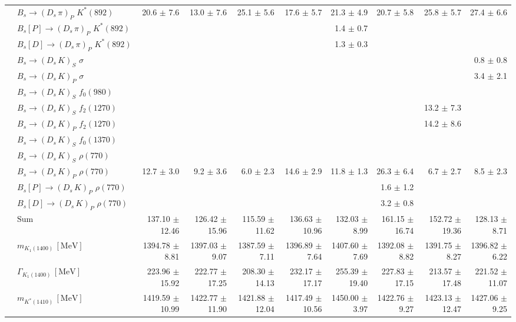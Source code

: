 \begin{tabular}{l l  r  r  r  r  r  r  r  r  }
 & $B_s \to ( D_s \, \pi)_{P} \, \, K^{*}(892)$ & 20.6 $\pm$ 7.6 & 13.0 $\pm$ 7.6 & 25.1 $\pm$ 5.6 & 17.6 $\pm$ 5.7 & 21.3 $\pm$ 4.9 & 20.7 $\pm$ 5.8 & 25.8 $\pm$ 5.7 & 27.4 $\pm$ 6.6 \\ 
 & $B_s[P] \to ( D_s \, \pi)_{P} \, \, K^{*}(892)$ &  &  &  &  & 1.4 $\pm$ 0.7 &  &  &  \\ 
 & $B_s[D] \to ( D_s \, \pi)_{P} \, \, K^{*}(892)$ &  &  &  &  & 1.3 $\pm$ 0.3 &  &  &  \\ 
 & $B_s \to ( D_s \, K)_{S} \, \, \sigma$ &  &  &  &  &  &  &  & 0.8 $\pm$ 0.8 \\ 
 & $B_s \to ( D_s \, K)_{P} \, \, \sigma$ &  &  &  &  &  &  &  & 3.4 $\pm$ 2.1 \\ 
 & $B_s \to ( D_s \, K)_{S} \, \, f_0(980)$ &  &  &  &  &  &  &  &  \\ 
 & $B_s \to ( D_s \, K)_{S} \, \, f_2(1270)$ &  &  &  &  &  &  & 13.2 $\pm$ 7.3 &  \\ 
 & $B_s \to ( D_s \, K)_{P} \, \, f_2(1270)$ &  &  &  &  &  &  & 14.2 $\pm$ 8.6 &  \\ 
 & $B_s \to ( D_s \, K)_{S} \, \, f_0(1370)$ &  &  &  &  &  &  &  &  \\ 
 & $B_s \to ( D_s \, K)_{S} \, \, \rho(770)$ &  &  &  &  &  &  &  &  \\ 
 & $B_s \to ( D_s \, K)_{P} \, \, \rho(770)$ & 12.7 $\pm$ 3.0 & 9.2 $\pm$ 3.6 & 6.0 $\pm$ 2.3 & 14.6 $\pm$ 2.9 & 11.8 $\pm$ 1.3 & 26.3 $\pm$ 6.4 & 6.7 $\pm$ 2.7 & 8.5 $\pm$ 2.3 \\ 
 & $B_s[P] \to ( D_s \, K)_{P} \, \, \rho(770)$ &  &  &  &  &  & 1.6 $\pm$ 1.2 &  &  \\ 
 & $B_s[D] \to ( D_s \, K)_{P} \, \, \rho(770)$ &  &  &  &  &  & 3.2 $\pm$ 0.8 &  &  \\ 
 & $\text{Sum}$ & 137.10 $\pm$ 12.46 & 126.42 $\pm$ 15.96 & 115.59 $\pm$ 11.62 & 136.63 $\pm$ 10.96 & 132.03 $\pm$ 8.99 & 161.15 $\pm$ 16.74 & 152.72 $\pm$ 19.36 & 128.13 $\pm$ 8.71 \\ 
\hline
 & $m_{K_1(1400)} \, [\text{MeV}]$ & 1394.78 $\pm$ 8.81 & 1397.03 $\pm$ 9.07 & 1387.59 $\pm$ 7.11 & 1396.89 $\pm$ 7.64 & 1407.60 $\pm$ 7.69 & 1392.08 $\pm$ 8.82 & 1391.75 $\pm$ 8.27 & 1396.82 $\pm$ 6.22 \\ 
 & $\Gamma_{K_1(1400)} \, [\text{MeV}]$ & 223.96 $\pm$ 15.92 & 222.77 $\pm$ 17.25 & 208.30 $\pm$ 14.13 & 232.17 $\pm$ 17.17 & 255.39 $\pm$ 19.40 & 227.83 $\pm$ 17.15 & 213.57 $\pm$ 17.48 & 221.52 $\pm$ 11.07 \\ 
 & $m_{K^{*}(1410)} \, [\text{MeV}]$ & 1419.59 $\pm$ 10.99 & 1422.77 $\pm$ 11.90 & 1421.88 $\pm$ 12.04 & 1417.49 $\pm$ 10.56 & 1450.00 $\pm$ 3.97 & 1422.76 $\pm$ 9.27 & 1423.13 $\pm$ 12.47 & 1427.06 $\pm$ 9.25 \\ 

\end{tabular}
